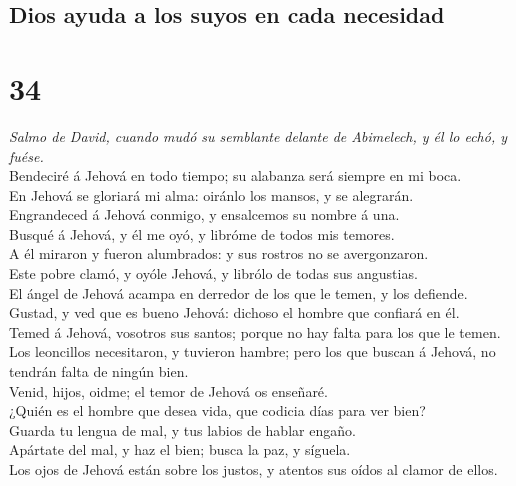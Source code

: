 \hypertarget{dios-ayuda-a-los-suyos-en-cada-necesidad}{%
\subsection{Dios ayuda a los suyos en cada
necesidad}\label{dios-ayuda-a-los-suyos-en-cada-necesidad}}

\hypertarget{section-33}{%
\section{34}\label{section-33}}

 \emph{Salmo de David, cuando mudó su semblante delante de
Abimelech, y él lo echó, y fuése.}\\
Bendeciré á Jehová en todo tiempo; su alabanza será siempre en mi
boca.\\
 En Jehová se gloriará mi alma: oiránlo los mansos, y se
alegrarán.\\
 Engrandeced á Jehová conmigo, y ensalcemos su nombre á
una.\\
 Busqué á Jehová, y él me oyó, y libróme de todos mis
temores.\\
 A él miraron y fueron alumbrados: y sus rostros no se
avergonzaron.\\
 Este pobre clamó, y oyóle Jehová, y librólo de todas sus
angustias.\\
 El ángel de Jehová acampa en derredor de los que le temen,
y los defiende.\\
 Gustad, y ved que es bueno Jehová: dichoso el hombre que
confiará en él.\\
 Temed á Jehová, vosotros sus santos; porque no hay falta
para los que le temen.\\
 Los leoncillos necesitaron, y tuvieron hambre; pero los
que buscan á Jehová, no tendrán falta de ningún bien.\\
 Venid, hijos, oidme; el temor de Jehová os enseñaré.\\
 ¿Quién es el hombre que desea vida, que codicia días para
ver bien?\\
 Guarda tu lengua de mal, y tus labios de hablar engaño.\\
 Apártate del mal, y haz el bien; busca la paz, y
síguela.\\
 Los ojos de Jehová están sobre los justos, y atentos sus
oídos al clamor de ellos.\\

